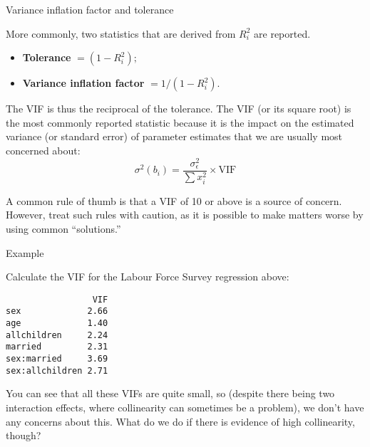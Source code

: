 \documentclass[10pt,ignorenonframetext,]{beamer}
\providecommand{\tightlist}{%
  \setlength{\itemsep}{0pt}\setlength{\parskip}{0pt}}
\begin{document}
\begin{frame}{Variance inflation factor and tolerance}

More commonly, two statistics that are derived from \(R^2_i\) are
reported.

\begin{itemize}
\tightlist
\item
  \textbf{Tolerance} \(= (1 - R_i^2);\)
\item
  \textbf{Variance inflation factor} \(= 1 / (1 - R^2_i).\)
\end{itemize}

The VIF is thus the reciprocal of the tolerance. The VIF (or its square
root) is the most commonly reported statistic because it is the impact
on the estimated variance (or standard error) of parameter estimates
that we are usually most concerned about: \[
\sigma^2(b_i) = \frac{\sigma^2_\epsilon}{\sum x_i^2} \times \text{VIF}
\]

A common rule of thumb is that a VIF of 10 or above is a source of
concern. However, treat such rules with caution, as it is possible to
make matters worse by using common ``solutions.''

\end{frame}

\begin{frame}[fragile]{Example}

Calculate the VIF for the Labour Force Survey regression above:

\begin{verbatim}
                 VIF
sex             2.66
age             1.40
allchildren     2.24
married         2.31
sex:married     3.69
sex:allchildren 2.71
\end{verbatim}

You can see that all these VIFs are quite small, so (despite there being
two interaction effects, where collinearity can sometimes be a problem),
we don't have any concerns about this. What do we do if there is
evidence of high collinearity, though?

\end{frame}
\end{document}
